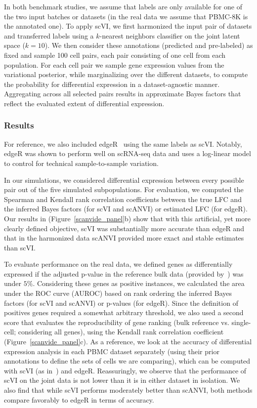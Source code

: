In both benchmark studies, we assume that labels are only available for one of the two input batches or datasets (in the real data we assume that PBMC-8K is the annotated one). To apply scVI, we first harmonized the input pair of datasets and transferred labels using a $k$-nearest neighbors classifier on the joint latent space ($k=10$). We then consider these annotations (predicted and pre-labeled) as fixed and sample 100 cell pairs, each pair consisting of one cell from each population. For each cell pair we sample gene expression values from the variational posterior, while marginalizing over the different datasets, to compute the probability for differential expression in a dataset-agnostic manner. Aggregating across all selected pairs results in approximate Bayes factors that reflect the evaluated extent of differential expression. 

\subsubsection{Results}

For reference, we also included edgeR~\cite{edgeR} using the same labels as scVI. Notably, edgeR was shown to perform well on scRNA-seq data \cite{soneson2018bias} and uses a log-linear model to control for technical sample-to-sample variation.

In our simulations, we considered differential expression between every possible pair out of the five simulated subpopulations. For evaluation, we computed the Spearman and Kendall rank correlation coefficients between the true LFC and the inferred Bayes factors (for scVI and scANVI) or estimated LFC (for edgeR). Our results in (Figure~\ref{scanvide_panel}b) show that with this artificial, yet more clearly defined objective, scVI was substantially more accurate than edgeR and that in the harmonized data scANVI provided more exact and stable estimates than scVI. 

To evaluate performance on the real data, we defined genes as differentially expressed if the adjusted p-value in the reference bulk data (provided by~\cite{Nakaya2011, Gorgun2005}) was under $5 \%$. Considering these genes as positive instances, we calculated the area under the ROC curve (AUROC) based on rank ordering the inferred Bayes factors (for scVI and scANVI) or p-values (for edgeR). Since the definition of positives genes required a somewhat arbitrary threshold, we also used a second score that evaluates the reproducibility of gene ranking (bulk reference vs. single-cell; considering all genes), using the Kendall rank correlation coefficient (Figure~\ref{scanvide_panel}c). As a reference, we look at the accuracy of differential expression analysis in each PBMC dataset separately (using their prior annotations to define the sets of cells we are comparing), which can be computed with scVI (as in~\cite{scvi}) and edgeR. Reassuringly, we observe that the performance of scVI on the joint data is not lower than it is in either dataset in isolation. We also find that while scVI performs moderately better than scANVI, both methods compare favorably to edgeR in terms of accuracy. 

